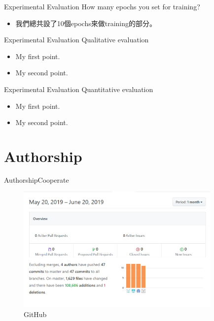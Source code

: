 \documentclass{beamer}
\begin{document}
\begin{frame}{ Experimental Evaluation }{How many epochs you set for training?}
\begin{CJK*}{UTF8}{bsmi}
  \begin{itemize}
  \item {
   我們總共設了10個epochs來做training的部分。
  }
  \end{itemize}
\end{CJK*}
\end{frame}

\begin{frame}{ Experimental Evaluation }{Qualitative evaluation }
  \begin{itemize}
  \item {
    My first point.
  }
  \item {
    My second point.
  }
  \end{itemize}
\end{frame}

\begin{frame}{ Experimental Evaluation }{Quantitative evaluation }
  \begin{itemize}
  \item {
    My first point.
  }
  \item {
    My second point.
  }
  \end{itemize}
\end{frame}

\section{Authorship}

\begin{frame}{Authorship}{Cooperate}
\begin{CJK*}{UTF8}{bsmi}
\begin{figure}[h]
\begin{center}
\includegraphics[width=10cm]{Github.jpg} 
\end{center} 
\label{fig:1} 
\caption{GitHub} 
\end{figure}
\end{CJK*}
\end{frame}
\end{document}
